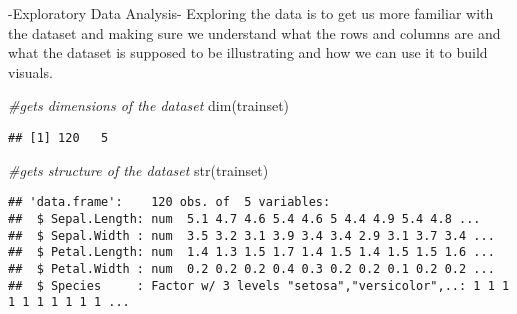 \documentclass[
]{article}
\newenvironment{Shaded}{\begin{snugshade}}{\end{snugshade}}
\newcommand{\AttributeTok}[1]{\textcolor[rgb]{0.77,0.63,0.00}{#1}}
\newcommand{\CommentTok}[1]{\textcolor[rgb]{0.56,0.35,0.01}{\textit{#1}}}
\newcommand{\ConstantTok}[1]{\textcolor[rgb]{0.00,0.00,0.00}{#1}}
\newcommand{\FloatTok}[1]{\textcolor[rgb]{0.00,0.00,0.81}{#1}}
\newcommand{\FunctionTok}[1]{\textcolor[rgb]{0.00,0.00,0.00}{#1}}
\newcommand{\NormalTok}[1]{#1}
\newcommand{\OtherTok}[1]{\textcolor[rgb]{0.56,0.35,0.01}{#1}}
\newcommand{\SpecialCharTok}[1]{\textcolor[rgb]{0.00,0.00,0.00}{#1}}
\begin{document}
\begin{Shaded}
\end{Shaded}

-Exploratory Data Analysis- Exploring the data is to get us more
familiar with the dataset and making sure we understand what the rows
and columns are and what the dataset is supposed to be illustrating and
how we can use it to build visuals.

\begin{Shaded}
\begin{Highlighting}[]
\CommentTok{\#gets dimensions of the dataset}
\FunctionTok{dim}\NormalTok{(trainset)}
\end{Highlighting}
\end{Shaded}

\begin{verbatim}
## [1] 120   5
\end{verbatim}

\begin{Shaded}
\begin{Highlighting}[]
\CommentTok{\#gets structure of the dataset}
\FunctionTok{str}\NormalTok{(trainset)}
\end{Highlighting}
\end{Shaded}

\begin{verbatim}
## 'data.frame':    120 obs. of  5 variables:
##  $ Sepal.Length: num  5.1 4.7 4.6 5.4 4.6 5 4.4 4.9 5.4 4.8 ...
##  $ Sepal.Width : num  3.5 3.2 3.1 3.9 3.4 3.4 2.9 3.1 3.7 3.4 ...
##  $ Petal.Length: num  1.4 1.3 1.5 1.7 1.4 1.5 1.4 1.5 1.5 1.6 ...
##  $ Petal.Width : num  0.2 0.2 0.2 0.4 0.3 0.2 0.2 0.1 0.2 0.2 ...
##  $ Species     : Factor w/ 3 levels "setosa","versicolor",..: 1 1 1 1 1 1 1 1 1 1 ...
\end{verbatim}
\end{document}
